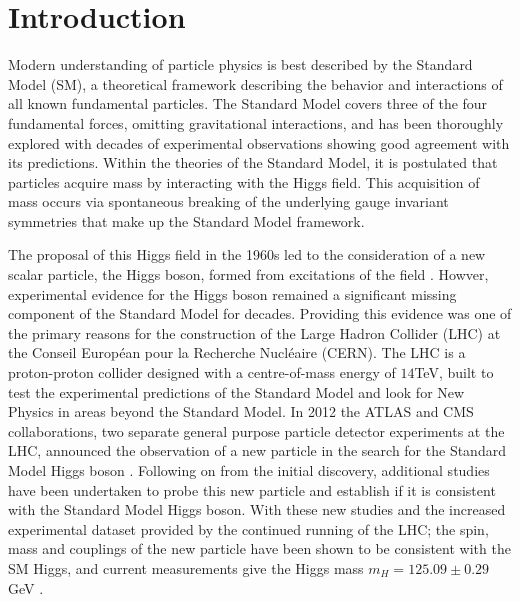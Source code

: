 \chapter{Introduction}
\label{c:intro}

Modern understanding of particle physics is best described by the Standard Model (SM), a theoretical framework describing the behavior and interactions of all known fundamental particles. The Standard Model covers three of the four fundamental forces, omitting gravitational interactions, and has been thoroughly explored with decades of experimental observations showing good agreement with its predictions. Within the theories of the Standard Model, it is postulated that particles acquire mass by interacting with the Higgs field. This acquisition of mass occurs via spontaneous breaking of the underlying gauge invariant symmetries that make up the Standard Model framework.

The proposal of this Higgs field in the 1960s led to the consideration of a new scalar particle, the Higgs boson, formed from excitations of the field \cite{gauge-boson-mass, higgs-1, higgs-2}. Howver, experimental evidence for the Higgs boson remained a significant missing component of the Standard Model for decades. Providing this evidence was one of the primary reasons for the construction of the Large Hadron Collider \cite{lhc} (LHC) at the  Conseil Europ\'{e}an pour la Recherche Nucl\'{e}aire (CERN). The LHC is a proton-proton collider designed with a centre-of-mass energy of $14$TeV, built to test the experimental predictions of the Standard Model and look for New Physics in areas beyond the Standard Model. In 2012 the ATLAS and CMS collaborations, two separate general purpose particle detector experiments at the LHC, announced the observation of a new particle in the search for the Standard Model Higgs boson \cite{cmshiggs, atlashiggs}. Following on from the initial discovery, additional studies have been undertaken to probe this new particle and establish if it is consistent with the Standard Model Higgs boson. With these new studies and the increased experimental dataset provided by the continued running of the LHC; the spin, mass and couplings of the new particle have been shown to be consistent with the SM Higgs, and current measurements give the Higgs mass $m_H=125.09\pm0.29$GeV \cite{higgsmeasure}.

